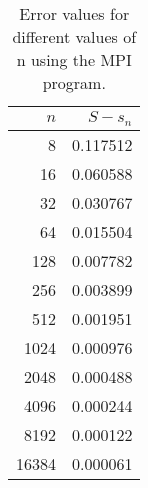 \documentclass{article}
\begin{document}
\begin{table}
\centering
\caption{Error values for different values of n using the MPI program.}
\label{tab:MPIerror}
\begin{tabular}{rr}
$n$ & $S-s_n$  \\ 
\hline 
8 & 0.117512 \\ 
16 & 0.060588 \\ 
32 & 0.030767 \\ 
64 & 0.015504 \\ 
128 & 0.007782 \\ 
256 & 0.003899 \\ 
512 & 0.001951 \\ 
1024 & 0.000976 \\ 
2048 & 0.000488 \\ 
4096 & 0.000244 \\ 
8192 & 0.000122 \\ 
16384 & 0.000061
\end{tabular}
\end{table} 
  
 
 
\end{document}
